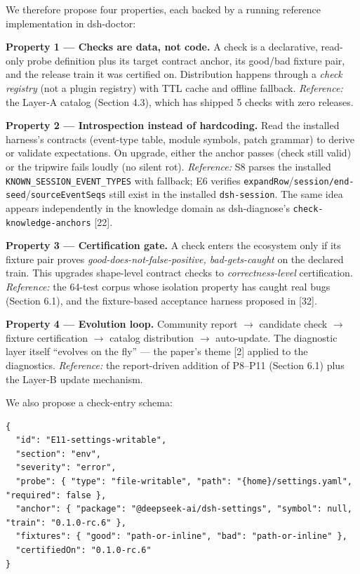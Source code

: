 \documentclass[11pt]{article}
\begin{document}
We therefore propose four properties, each backed by a running reference
implementation in dsh-doctor:

\textbf{Property 1 --- Checks are data, not code.} A check is a
declarative, read-only probe definition plus its target contract anchor,
its good/bad fixture pair, and the release train it was certified on.
Distribution happens through a \emph{check registry} (not a plugin
registry) with TTL cache and offline fallback. \emph{Reference:} the
Layer-A catalog (Section 4.3), which has shipped 5 checks with zero
releases.

\textbf{Property 2 --- Introspection instead of hardcoding.} Read the
installed harness's contracts (event-type table, module symbols, patch
grammar) to derive or validate expectations. On upgrade, either the
anchor passes (check still valid) or the tripwire fails loudly (no
silent rot). \emph{Reference:} S8 parses the installed
\texttt{KNOWN\_SESSION\_EVENT\_TYPES} with fallback; E6 verifies
\texttt{expandRow}/\texttt{session/end-seed}/\texttt{sourceEventSeqs}
still exist in the installed \texttt{dsh-session}. The same idea appears
independently in the knowledge domain as dsh-diagnose's
\texttt{check-knowledge-anchors} [22].

\textbf{Property 3 --- Certification gate.} A check enters the ecosystem
only if its fixture pair proves \emph{good-does-not-false-positive,
bad-gets-caught} on the declared train. This upgrades shape-level
contract checks to \emph{correctness-level} certification.
\emph{Reference:} the 64-test corpus whose isolation property has caught
real bugs (Section 6.1), and the fixture-based acceptance harness
proposed in [32].

\textbf{Property 4 --- Evolution loop.} Community report  $\to$  candidate
check  $\to$  fixture certification  $\to$  catalog distribution  $\to$  auto-update. The
diagnostic layer itself ``evolves on the fly'' --- the paper's theme
[2] applied to the diagnostics. \emph{Reference:} the report-driven
addition of P8--P11 (Section 6.1) plus the Layer-B update mechanism.

We also propose a check-entry schema:

\begin{verbatim}
{
  "id": "E11-settings-writable",
  "section": "env",
  "severity": "error",
  "probe": { "type": "file-writable", "path": "{home}/settings.yaml", "required": false },
  "anchor": { "package": "@deepseek-ai/dsh-settings", "symbol": null, "train": "0.1.0-rc.6" },
  "fixtures": { "good": "path-or-inline", "bad": "path-or-inline" },
  "certifiedOn": "0.1.0-rc.6"
}
\end{verbatim}
\end{document}
